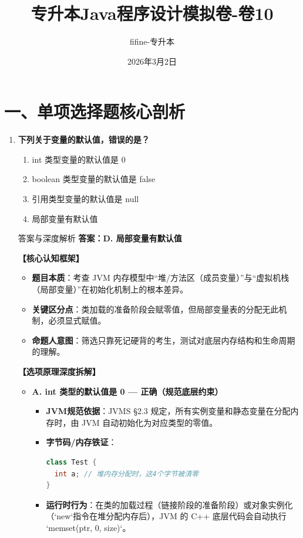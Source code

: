 \documentclass[12pt, a4paper]{ctexart}
\title{\textcolor{myblue}{\textbf{专升本Java程序设计模拟卷-卷10}}}
\author{fifine-专升本}
\date{2026年3月2日}
\begin{document}
\maketitle
\thispagestyle{empty}
\newpage

\section{一、单项选择题核心剖析}

\begin{enumerate}[label=\textbf{\arabic*.}]

	\item \textbf{下列关于变量的默认值，错误的是？}
	      \begin{enumerate}[label=\Alph*.]
		      \item int 类型变量的默认值是 0
		      \item boolean 类型变量的默认值是 false
		      \item 引用类型变量的默认值是 null
		      \item 局部变量有默认值
	      \end{enumerate}

	      \begin{bluebox}{答案与深度解析}
		      \textbf{答案：D. 局部变量有默认值}

		      \textbf{【核心认知框架】}
		      \begin{itemize}[leftmargin=*, nosep]
			      \item \textbf{题目本质}：考查 JVM 内存模型中“堆/方法区（成员变量）”与“虚拟机栈（局部变量）”在初始化机制上的根本差异。
			      \item \textbf{关键区分点}：类加载的准备阶段会赋零值，但局部变量表的分配无此机制，必须显式赋值。
			      \item \textbf{命题人意图}：筛选只靠死记硬背的考生，测试对底层内存结构和生命周期的理解。
		      \end{itemize}

		      \textbf{【选项原理深度拆解】}
		      \begin{itemize}[leftmargin=*, nosep]

			      \item \textbf{A. int 类型的默认值是 0 — 正确（规范底层约束）}
			            \begin{itemize}[leftmargin=*, nosep]
				            \item \textbf{JVM规范依据}：JVMS §2.3 规定，所有实例变量和静态变量在分配内存时，由 JVM 自动初始化为对应类型的零值。
				            \item \textbf{字节码/内存铁证}：
				                  \begin{lstlisting}[language=Java]
class Test { 
  int a; // 堆内存分配时，这4个字节被清零
}
                      \end{lstlisting}
				            \item \textbf{运行时行为}：在类的加载过程（链接阶段的准备阶段）或对象实例化（`new`指令在堆分配内存后），JVM 的 C++ 底层代码会自动执行 `memset(ptr, 0, size)`。
			            \end{itemize}


\end{itemize}
\end{bluebox}
\end{enumerate}
\end{document}

